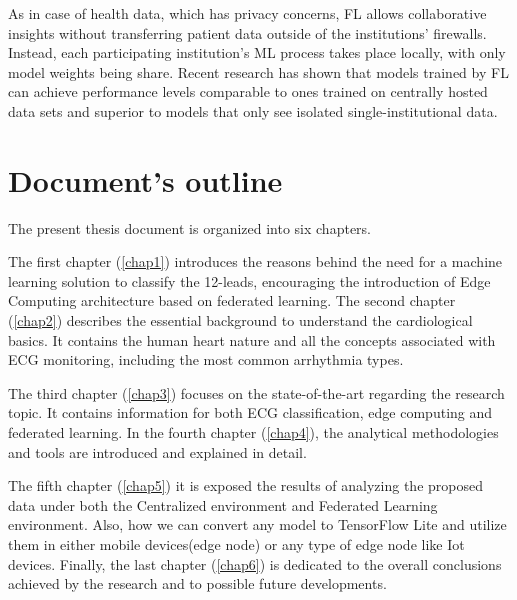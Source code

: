 As in case of health data, which has privacy concerns, FL allows collaborative insights without transferring patient data outside of the institutions’ firewalls. Instead, each participating institution’s ML process takes place locally, with only model weights being share. Recent research has shown that models trained by FL can achieve performance levels comparable to ones trained on centrally hosted data sets and superior to models that only see isolated single-institutional data. \cite{Rieke_2020}





\section{Document's outline} \label{doc_struct}

The present thesis document is organized into six chapters. 

The first chapter (\ref{chap1}) introduces the reasons behind the need for a machine learning solution to classify the 12-leads, encouraging the introduction of Edge Computing architecture based on federated learning. The second chapter (\ref{chap2}) describes the essential background to understand the cardiological basics. It contains the human heart nature and all the concepts associated with ECG monitoring, including the most common arrhythmia types.

The third chapter (\ref{chap3}) focuses on the state-of-the-art regarding the research topic. It contains information for both ECG classification, edge computing and federated learning. In the fourth chapter (\ref{chap4}), the analytical methodologies and tools are introduced and explained in detail. 

The fifth chapter (\ref{chap5}) it is exposed the results of analyzing the proposed data under both the Centralized environment and Federated Learning environment. Also, how we can convert any model to TensorFlow Lite and utilize them in either mobile devices(edge node) or any type of edge node like Iot devices.  Finally, the last chapter (\ref{chap6}) is dedicated to the overall conclusions achieved by the research and to possible future developments.